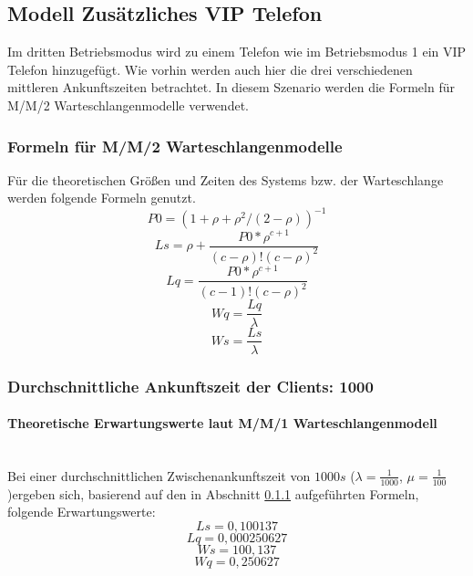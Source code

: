 \subsection{Modell \glqq Zusätzliches VIP Telefon\grqq} 
Im dritten Betriebsmodus wird zu einem Telefon wie im Betriebsmodus 1 ein VIP Telefon hinzugefügt. Wie vorhin werden auch hier die drei verschiedenen mittleren Ankunftszeiten betrachtet. In diesem Szenario werden die Formeln für M/M/2 Warteschlangenmodelle verwendet. 
\subsubsection{Formeln für M/M/2 Warteschlangenmodelle}
\label{Formeln2}
Für die theoretischen Größen und Zeiten des Systems bzw. der Warteschlange werden folgende Formeln genutzt.
\begin{equation}
P0=(1+\rho+\rho^2/(2-\rho))^{-1}
\end{equation}
\begin{equation}
Ls=\rho + \frac{P0*\rho^{c+1}}{(c-\rho)!(c-\rho)^2}
\end{equation}
\begin{equation}
Lq=\frac{P0*\rho^{c+1}}{(c-1)!(c-\rho)^2}
\end{equation}
\begin{equation}
Wq=\frac{Lq}{\lambda}
\end{equation}
\begin{equation}
Ws=\frac{Ls}{\lambda}
\end{equation}
\subsubsection{Durchschnittliche Ankunftszeit der Clients: 1000}
\paragraph{Theoretische Erwartungswerte laut M/M/1 Warteschlangenmodell}
\\
Bei einer durchschnittlichen Zwischenankunftszeit von $1000s$ ($\lambda=\frac{1}{1000}$, $\mu=\frac{1}{100}$)ergeben sich, basierend auf den in Abschnitt \ref{Formeln2} aufgeführten Formeln, folgende Erwartungswerte:
\begin{equation}
Ls=0,100137
\end{equation}
\begin{equation}
Lq=0,000250627
\end{equation}
\begin{equation}
Ws=100,137
\end{equation}
\begin{equation}
Wq=0,250627
\end{equation}

